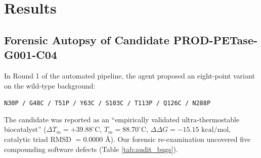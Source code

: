 \documentclass[10pt,twocolumn]{article}
\begin{document}
\section{Results}

\subsection{Forensic Autopsy of Candidate PROD-PETase-G001-C04}
In Round 1 of the automated pipeline, the agent proposed an eight-point variant on the wild-type background:
\begin{center}
\texttt{N30P / G48C / T51P / Y63C / S103C / T113P / Q126C / N288P}
\end{center}
The candidate was reported as an ``empirically validated ultra-thermostable biocatalyst'' ($\Delta T_m = +39.88^\circ\text{C}$, $T_m = 88.70^\circ\text{C}$, $\Delta\Delta G = -15.15\text{ kcal/mol}$, catalytic triad RMSD $= 0.0000\text{ \AA}$). Our forensic re-examination uncovered five compounding software defects (Table \ref{tab:audit_bugs}).
\end{document}
